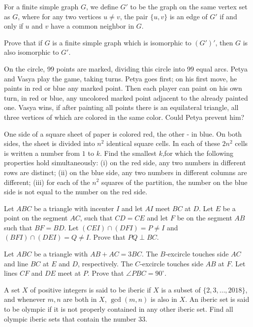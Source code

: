 \documentclass[11pt]{scrartcl}
\begin{document}
\begin{problem}[8489819892706651399]
For a finite simple graph $G$, we define $G'$ to be the graph on the same vertex set as $G$, where for any two vertices $u \neq v$, the pair $\{u,v\}$ is an edge of $G'$ if and only if $u$ and $v$ have a common neighbor in $G$.

Prove that if $G$ is a finite simple graph which is isomorphic to $(G')'$, then $G$ is also isomorphic to $G'$.
\end{problem}
\begin{problem}[2117883853443241027]
On the circle, 99 points are marked, dividing this circle into 99 equal arcs. Petya and Vasya play the game, taking turns. Petya goes first; on his first move, he paints in red or blue any marked point. Then each player can paint on his own turn, in red or blue, any uncolored marked point adjacent to the already painted one. Vasya wins, if after painting all points there is an equilateral triangle, all three vertices of which are colored in the same color. Could Petya prevent him?
\end{problem}
\begin{problem}[8317584744128058138]
	One side of a square sheet of paper is colored red, the other - in blue. On both sides, the sheet is divided into $n^2$ identical square cells. In each of these $2n^2$ cells is written a number from $1$ to $k$. Find the smallest $k$,for which the following properties hold simultaneously:
(i) on the red side, any two numbers in different rows are distinct;
(ii) on the blue side, any two numbers in different columns are different;
(iii) for each of the $n^2$ squares of the partition, the number on the blue side is not equal to the number on the red side.
\end{problem}
\begin{problem}[748238852463934]
	Let $ABC$ be a triangle with incenter $I$ and let $AI$ meet $BC$ at $D$. Let $E$ be a point on the segment $AC$, such that $CD=CE$ and let $F$ be on the segment $AB$ such that $BF=BD$. Let $(CEI) \cap (DFI)=P \neq I$ and $(BFI) \cap (DEI)=Q \neq I$. Prove that $PQ \perp BC$.
\end{problem}
\begin{problem}[760426813975831]
Let $ABC$ be a triangle with $AB+AC=3BC$. The $B$-excircle touches side $AC$ and line $BC$ at $E$ and $D$, respectively. The $C$-excircle touches side $AB$ at $F$. Let lines $CF$ and $DE$ meet at $P$. Prove that $\angle PBC = 90^{\circ}$.
\end{problem}
\begin{problem}[3214097809181137769]
	A set $X$ of positive integers is said to be iberic if $X$ is a subset of $\{2, 3, \dots, 2018\}$, and whenever $m, n$ are both in $X$, $\gcd(m, n)$ is also in $X$. An iberic set is said to be olympic if it is not properly contained in any other iberic set. Find all olympic iberic sets that contain the number $33$.
\end{problem}
\end{document}
